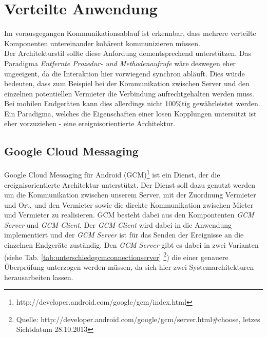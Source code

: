 
\section{Verteilte Anwendung}

Im vorausgegangen Kommunikationsablauf ist erkennbar, dass mehrere verteilte Komponenten untereinander kohärent kommunizieren müssen.\\

Der Architekturstil sollte diese Anfordung dementsprechend unterstützen. Das Paradigma \textit{Entfernte Prozedur- und Methodenaufrufe} wäre deswegen eher ungeeigent, da die Interaktion hier vorwiegend synchron abläuft. Dies würde bedeuten, dass zum Beispiel bei der Kommunikation zwischen Server und den einzelnen potentiellen Vermieter die Verbindung aufrechtgehalten werden muss. Bei mobilen Endgeräten kann dies allerdings nicht 100\%tig gewährleistet werden.
Ein Paradigma, welches die Eigenschaften einer losen Kopplungen untersützt ist eher vorzuziehen - eine ereignisorientierte Architektur.\\



\subsection{Google Cloud Messaging}

Google Cloud Messaging für Android (GCM)\footnote{http://developer.android.com/google/gcm/index.html} ist ein Dienst, der die ereignisorientierte Architektur unterstützt.
Der Dienst soll dazu genutzt werden um die Kommunikation zwischen unserem Server, mit der Zuordnung Vermieter und Ort, und den Vermieter sowie die direkte Kommunikation zwischen Mieter und Vermieter zu realisieren.
GCM besteht dabei aus den Kompontenten \textit{GCM Server} und \textit{GCM Client}.
Der \textit{GCM Client} wird dabei in die Anwendung implementiert und der \textit{GCM Server} ist für das Senden der Ereignisse an die einzelnen Endgeräte zuständig. Den \textit{GCM Server} gibt es dabei in zwei Varianten (siehe Tab. \ref{tab:unterschiedegcmconnectionserver} \footnote{Quelle: http://developer.android.com/google/gcm/server.html\#choose, letzes Sichtdatum 28.10.2013}) die einer genauere Überprüfung unterzogen werden müssen, da sich hier zwei Systemarchitekturen herausarbeiten lassen.


